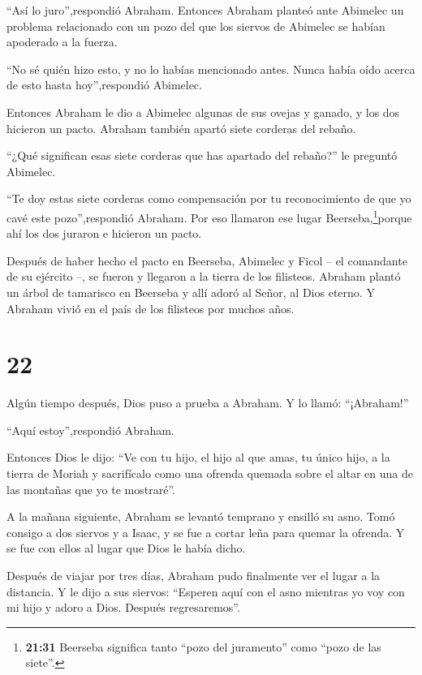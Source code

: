  ``Así lo juro'',respondió Abraham.  Entonces
Abraham planteó ante Abimelec un problema relacionado con un pozo del
que los siervos de Abimelec se habían apoderado a la fuerza.

 ``No sé quién hizo esto, y no lo habías mencionado antes.
Nunca había oído acerca de esto hasta hoy'',respondió Abimelec.

 Entonces Abraham le dio a Abimelec algunas de sus ovejas y
ganado, y los dos hicieron un pacto.  Abraham también
apartó siete corderas del rebaño.

 ``¿Qué significan esas siete corderas que has apartado del
rebaño?'' le preguntó Abimelec.

 ``Te doy estas siete corderas como compensación por tu
reconocimiento de que yo cavé este pozo'',respondió Abraham.
 Por eso llamaron ese lugar Beerseba,\footnote{\textbf{21:31}
  Beerseba significa tanto ``pozo del juramento'' como ``pozo de las
  siete''.}porque ahí los dos juraron e hicieron un pacto.

 Después de haber hecho el pacto en Beerseba, Abimelec y
Ficol -- el comandante de su ejército --, se fueron y llegaron a la
tierra de los filisteos.  Abraham plantó un árbol de
tamarisco en Beerseba y allí adoró al Señor, al Dios eterno.
 Y Abraham vivió en el país de los filisteos por muchos
años.

\hypertarget{section-21}{%
\section{22}\label{section-21}}

 Algún tiempo después, Dios puso a prueba a Abraham. Y lo
llamó: ``¡Abraham!''

``Aquí estoy'',respondió Abraham.

 Entonces Dios le dijo: ``Ve con tu hijo, el hijo al que
amas, tu único hijo, a la tierra de Moriah y sacrifícalo como una
ofrenda quemada sobre el altar en una de las montañas que yo te
mostraré''.

 A la mañana siguiente, Abraham se levantó temprano y
ensilló su asno. Tomó consigo a dos siervos y a Isaac, y se fue a cortar
leña para quemar la ofrenda. Y se fue con ellos al lugar que Dios le
había dicho.

 Después de viajar por tres días, Abraham pudo finalmente
ver el lugar a la distancia.  Y le dijo a sus siervos:
``Esperen aquí con el asno mientras yo voy con mi hijo y adoro a Dios.
Después regresaremos''.

